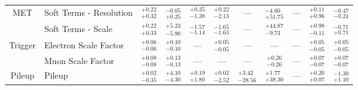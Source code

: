 \begin{tabular}{|cl||ccccccc|c||c|}
\hline
\multirow{2}{*}{MET}
&Soft Terms - Resolution &  $^{+0.22}_{+0.32}$  &  $^{-0.05}_{+0.25}$  &  $^{+0.35}_{-1.38}$  &  $^{+0.22}_{-2.13}$  & --- &  $^{-4.60}_{+51.75}$  & --- &  $^{+0.11}_{+0.96}$  &  $^{-0.47}_{-0.24}$ \\ 
\cline{2-11}
&Soft Terms - Scale &  $^{+0.22}_{+0.33}$  &  $^{+5.23}_{-5.90}$  &  $^{-1.57}_{-1.14}$  &  $^{-1.65}_{-1.63}$  & --- &  $^{+44.87}_{-9.73}$  & --- &  $^{+0.98}_{-0.11}$  &  $^{-0.71}_{+0.71}$ \\ 
\hline
\multirow{2}{*}{Trigger}
&Electron Scale Factor &  $^{+0.06}_{-0.06}$  &  $^{+0.10}_{-0.10}$  & --- &  $^{+0.05}_{-0.05}$  & --- & --- & --- &  $^{+0.05}_{-0.05}$  &  $^{+0.05}_{-0.05}$ \\ 
\cline{2-11}
&Muon Scale Factor &  $^{+0.08}_{-0.08}$  &  $^{+0.13}_{-0.13}$  & --- & --- & --- &  $^{+0.26}_{-0.26}$  & --- &  $^{+0.07}_{-0.07}$  &  $^{+0.07}_{-0.07}$ \\ 
\hline
\multirow{1}{*}{Pileup}
&Pileup &  $^{+0.02}_{-0.35}$  &  $^{+4.10}_{-4.30}$  &  $^{+0.19}_{+1.80}$  &  $^{+0.02}_{-2.52}$  &  $^{+3.42}_{-28.56}$  &  $^{+1.77}_{+38.30}$  & --- &  $^{+0.20}_{+0.07}$  &  $^{-1.30}_{+1.10}$ \\ 
\hline
\end{tabular}

